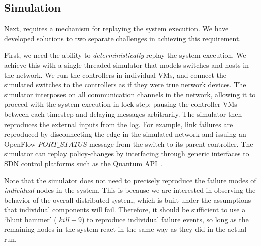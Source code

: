 


\subsection{Simulation}

Next, \simulator{} requires a mechanism for replaying the system execution.
We have developed
solutions to two separate challenges in achieving this requirement.

First, we need the ability to {\em deterministically} replay the system
execution. We achieve this with a single-threaded simulator that models switches
and hosts in the network. We run the controllers in individual VMs, and
connect the simulated switches to the controllers as if they were true
network devices. The simulator interposes on all communication channels in
the network, allowing it to proceed with the system execution in lock step:
pausing the controller VMs between each timestep and delaying messages
arbitrarily. The simulator then reproduces the external inputs from the log.
For example, link failures are reproduced by disconnecting the edge in
the simulated network and issuing an
OpenFlow $PORT\_STATUS$ message from the switch to its parent controller. The
simulator can replay policy-changes by
interfacing through generic interfaces to SDN control platforms such as the
Quantum API~\cite{quantum}.

Note that the simulator does not need
to precisely reproduce the failure modes of {\em individual} nodes in the system. This is because
we are interested in observing the behavior of the overall distributed system, which is
built under the assumptions that individual components will fail.
Therefore, it should be sufficient to use a `blunt hammer' (\eg{}
$kill -9$) to reproduce individual
failure events, so long as the remaining nodes in the system react in the same
way as they did in the actual run.

